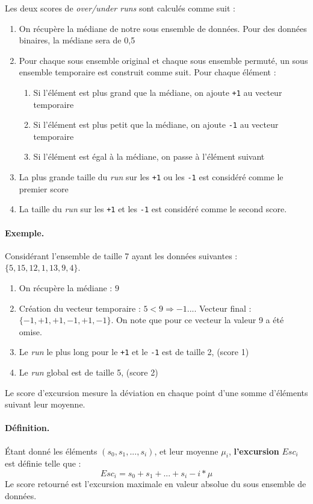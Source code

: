  
Les deux scores de \textit{over/under runs} sont calculés comme suit : 
\begin{enumerate}
\item On récupère la médiane de notre sous ensemble de données. Pour des données binaires, la médiane sera de 0,5
\item Pour chaque sous ensemble original et chaque sous ensemble permuté, un sous ensemble temporaire est construit comme suit. Pour chaque élément : 
	\begin{enumerate}
	\item Si l'élément est plus grand que la médiane, on ajoute \texttt{+1} au vecteur temporaire
 	\item Si l'élément est plus petit que la médiane, on ajoute \texttt{-1} au vecteur temporaire
	\item Si l'élément est égal à la médiane, on passe à l'élément suivant	
	\end{enumerate}
\item La plus grande taille du \textit{run} sur les \texttt{+1} ou les \texttt{-1} est considéré comme le premier score 
\item La taille du \textit{run} sur les \texttt{+1} et les \texttt{-1} est considéré comme le second score.
\end{enumerate}

\paragraph{Exemple.\\}
Considérant l'ensemble de taille 7 ayant les données suivantes : $\lbrace 5,15,12,1,13,9,4\rbrace$.
\begin{enumerate}
\item On récupère la médiane : $9$
\item Création du vecteur temporaire : $5<9 \Rightarrow -1 ...$. Vecteur final : $\lbrace -1, +1,+1,-1,+1,-1 \rbrace$. On note que pour ce vecteur la valeur 9 a été omise.
\item Le \textit{run} le plus long pour le \texttt{+1} et le \texttt{-1} est de taille 2, (score 1)
\item Le \textit{run} global est de taille 5, (score 2)
\end{enumerate}

Le score d'excursion mesure la déviation en chaque point d'une somme d'éléments suivant leur moyenne.

\paragraph{Définition.\\}
 Étant donné les éléments $(s_0,s_1,...,s_i)$, et leur moyenne $\mu_i$, \textbf{l'excursion} $Esc_i$ est définie telle que :
 $$ Esc_i= s_0+ s_1 + ... + s_i - i*\mu$$ 
Le score retourné est l'excursion maximale en valeur absolue du sous ensemble de données. \\

